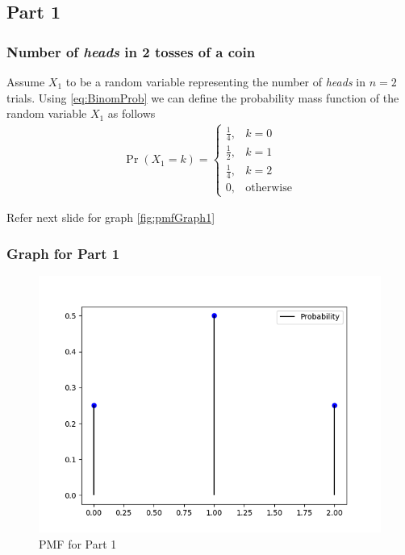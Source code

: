 \documentclass{beamer}
\begin{document}
\subsection{Part 1}
\begin{frame}
  \frametitle{Number of \emph{heads} in 2 tosses of a coin}
  Assume $X_1$ to be a random variable representing the number of \emph{heads} in $n = 2$ trials. Using
  \eqref{eq:BinomProb}
  we can define the probability mass function of the random variable $X_1$ as follows
  \begin{align}
    \Pr(X_1 = k) = 
    \begin{cases}
      \frac{1}{4}, & k = 0 \\
      \frac{1}{2}, & k = 1 \\
      \frac{1}{4}, & k = 2 \\
      0, & \text{otherwise}
    \end{cases}
    \label{eq:Pmf1}
  \end{align}

  Refer next slide for graph
  \eqref{fig:pmfGraph1}
\end{frame}

\begin{frame}
  \frametitle{Graph for Part 1}
  \begin{figure}[!ht]
    \centering
    \includegraphics[width=0.5\columnwidth]{../Figures/coin1.png}
    \caption{PMF for Part 1}
    \label{fig:pmfGraph1}
  \end{figure}
\end{frame}

\end{document}
